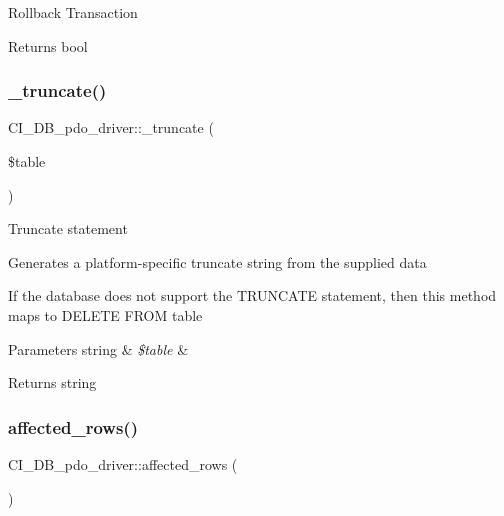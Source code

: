 Rollback Transaction

\begin{DoxyReturn}{Returns}
bool 
\end{DoxyReturn}
\mbox{\label{class_c_i___d_b__pdo__driver_a80dd8199909ae1d33cdbc3f64b7e5a9a}} 
\subsubsection{\texorpdfstring{\+\_\+truncate()}{\_truncate()}}
{\footnotesize\ttfamily C\+I\+\_\+\+D\+B\+\_\+pdo\+\_\+driver\+::\+\_\+truncate (\begin{DoxyParamCaption}\item[{}]{\$table }\end{DoxyParamCaption})\hspace{0.3cm}{\ttfamily [protected]}}

Truncate statement

Generates a platform-\/specific truncate string from the supplied data

If the database does not support the T\+R\+U\+N\+C\+A\+TE statement, then this method maps to \textquotesingle{}D\+E\+L\+E\+TE F\+R\+OM table\textquotesingle{}


\begin{DoxyParams}[1]{Parameters}
string & {\em \$table} & \\
\hline
\end{DoxyParams}
\begin{DoxyReturn}{Returns}
string 
\end{DoxyReturn}
\mbox{\label{class_c_i___d_b__pdo__driver_aa61ee0a06d52ca8acf3d6097044ef684}} 
\subsubsection{\texorpdfstring{affected\+\_\+rows()}{affected\_rows()}}
{\footnotesize\ttfamily C\+I\+\_\+\+D\+B\+\_\+pdo\+\_\+driver\+::affected\+\_\+rows (\begin{DoxyParamCaption}{ }\end{DoxyParamCaption})}

